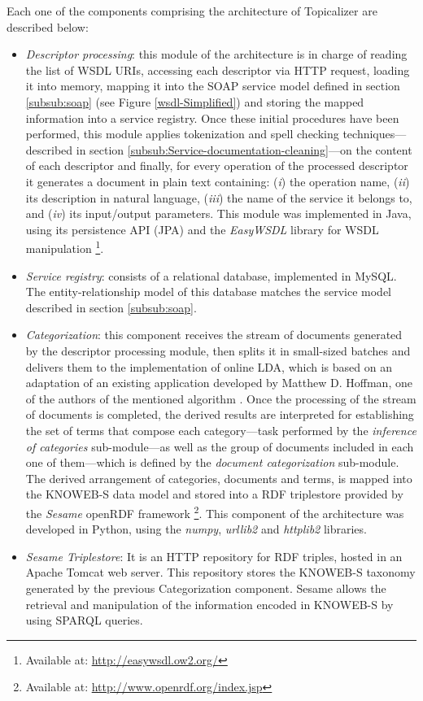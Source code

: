 Each one of the components comprising the architecture of Topicalizer are described below:
\begin{itemize}

\item \emph{Descriptor processing}: this module of the architecture is in charge of reading the list of WSDL URIs, accessing each descriptor via HTTP request, loading it into memory, mapping it into the SOAP service model defined in section \ref{subsub:soap} (see Figure \ref{wsdl-Simplified}) and storing the mapped information into a service registry. Once these initial procedures have been performed, this module applies tokenization and spell checking techniques---described in section \ref{subsub:Service-documentation-cleaning}---on the content of each descriptor and finally, for every operation of the processed descriptor it generates a document in plain text containing: (\emph{i}) the operation name, (\emph{ii}) its description in natural language, (\emph{iii}) the name of the service it belongs to, and (\emph{iv}) its input/output parameters. This module was implemented in Java, using its persistence API (JPA) and the \emph{EasyWSDL} library for WSDL manipulation \footnote{Available at: \href{http://
easywsdl.ow2.org/}{http://easywsdl.ow2.org/}}.

\item \emph{Service registry}: consists of a relational database, implemented in MySQL. The entity-relationship model of this database matches the service model described in section \ref{subsub:soap}. 

\item \emph{Categorization}: this component receives the stream of documents generated by the descriptor processing module, then splits it in small-sized batches and delivers them to the implementation of online LDA, which is based on an adaptation of an existing application developed by Matthew D. Hoffman, one of the authors of the mentioned algorithm \cite{Hoffman:2010}. Once the processing of the stream of documents is completed, the derived results are interpreted for establishing the set of terms that compose each category---task performed by the \emph{inference of categories }sub-module---as well as the group of documents included in each one of them---which is defined by the \emph{document categorization} sub-module. The derived arrangement of categories, documents and terms, is mapped into the KNOWEB-S data model and stored into a RDF triplestore provided by the \emph{Sesame} openRDF framework \footnote{Available at: \href{http://www.openrdf.org/index.jsp}{http://www.openrdf.org/index.jsp}}. This 
component of the architecture was developed in Python, using the \emph{numpy}, \emph{urllib2} and \emph{httplib2} libraries.

\item \emph{Sesame Triplestore}: It is an HTTP repository for RDF triples, hosted in an Apache Tomcat web server. This repository stores the KNOWEB-S taxonomy generated by the previous Categorization component. Sesame allows the retrieval and manipulation of the information encoded in KNOWEB-S by using SPARQL queries.
\end{itemize}


